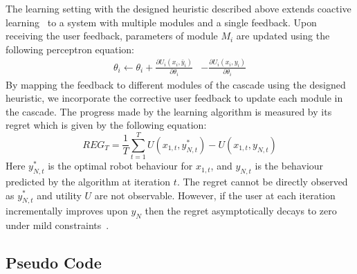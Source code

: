 The learning setting with the designed heuristic described above extends coactive learning~\citep{Jain13,Shivaswamy12} to a system with multiple modules and a single feedback. Upon receiving the user feedback, parameters of module $M_i$ are updated using the following perceptron equation:  
\begin{align}
\theta_i \leftarrow \theta_i +  \frac{\partial U_i(x_i,\bar{y}_i)}{\partial \theta_i} &- \frac{\partial U_i(x_i,{y}_i)}{\partial \theta_i}
\end{align}
By mapping the feedback to different modules of the cascade using the designed heuristic, we incorporate the corrective user feedback to update each module in the cascade. The progress made by the learning algorithm is measured by its regret which is given by the following equation:%
\begin{equation}
\label{eq:regret}
REG_T = \frac{1}{T}\sum_{t=1}^T U(x_{1,t},y_{N,t}^*) - U(x_{1,t},y_{N,t}) 
\end{equation}
Here $y_{N,t}^*$ is the optimal robot behaviour for $x_{1,t}$, and $y_{N,t}$ is the behaviour predicted by the algorithm at iteration $t$. The regret cannot be directly observed as $y_{N,t}^*$ and utility $U$ are not observable. However, if the user at each iteration incrementally improves upon $y_N$ then the regret asymptotically decays to zero under mild constraints~\citep{Shivaswamy12,Jain13}.

\subsection{Pseudo Code}

